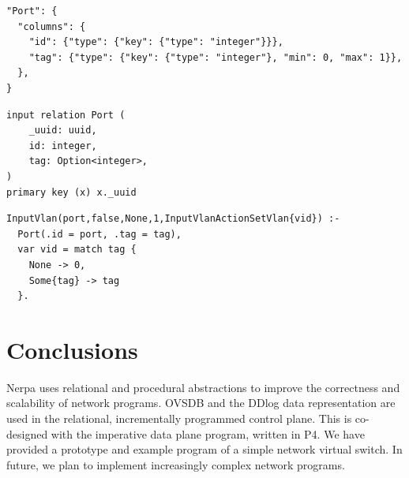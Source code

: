 \documentclass[sigconf, nonacm]{acmart}
\begin{document}
\noindent\begin{minipage}{.48\columnwidth}
\begin{lstlisting}[title=OVSDB schema,frame=tlrb]
"Port": {
  "columns": {
    "id": {"type": {"key": {"type": "integer"}}},
    "tag": {"type": {"key": {"type": "integer"}, "min": 0, "max": 1}},
  },
}
\end{lstlisting}
\end{minipage}\hfill
\begin{minipage}{.48\columnwidth}
\begin{lstlisting}[title=DDlog input relation generated from the OVSDB schema,frame=tlrb,language=ddlog]
input relation Port (
    _uuid: uuid,
    id: integer,
    tag: Option<integer>,
)
primary key (x) x._uuid
\end{lstlisting}
\end{minipage}

\begin{lstlisting}[title=DDlog rule for VLAN assignment written by programmer,frame=tlrb,language=ddlog]
InputVlan(port,false,None,1,InputVlanActionSetVlan{vid}) :-
  Port(.id = port, .tag = tag),
  var vid = match tag {
    None -> 0,
    Some{tag} -> tag
  }.
\end{lstlisting}

\section{Conclusions}
Nerpa uses relational and procedural abstractions to improve the correctness and scalability of network programs. OVSDB and the DDlog data representation are used in the relational, incrementally programmed control plane. This is co-designed with the imperative data plane program, written in P4. We have provided a prototype and example program of a simple network virtual switch. In future, we plan to implement increasingly complex network programs.



\end{document}
